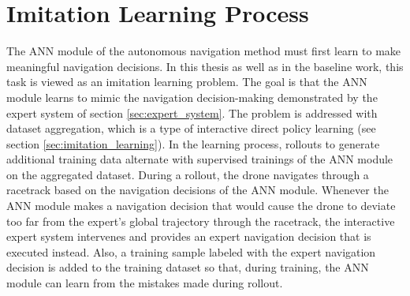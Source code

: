\section{Imitation Learning Process} \label{sec:training}
The ANN module of the autonomous navigation method 
must first learn to make meaningful navigation decisions.
In this thesis as well as in the baseline work,
this task is viewed as an imitation learning problem.
The goal is that the ANN module learns to mimic
the navigation decision-making demonstrated by the expert system
of section \ref{sec:expert_system}.
The problem is addressed with dataset aggregation,
which is a type of interactive direct policy learning
(see section \ref{sec:imitation_learning}).
In the learning process, 
rollouts to generate additional training data 
alternate with supervised trainings of the ANN module on the aggregated dataset.
During a rollout, the drone navigates through a racetrack
based on the navigation decisions of the ANN module.
Whenever the ANN module makes a navigation decision 
that would cause the drone to deviate too far from the
expert's global trajectory through the racetrack, 
the interactive expert system intervenes 
and provides an expert navigation decision that is executed instead.
Also, 
a training sample labeled with the expert navigation decision 
is added to the training dataset 
so that, during training, the ANN module can learn from the mistakes made
during rollout.


